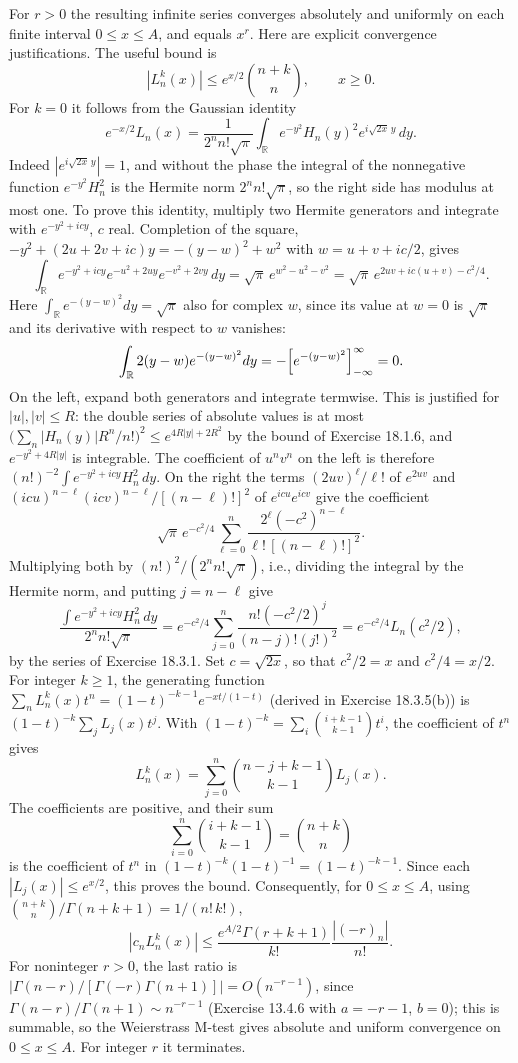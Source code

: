 For $r>0$ the resulting infinite series converges absolutely and
uniformly on each finite interval $0\le x\le A$, and equals $x^r$.
Here are explicit convergence justifications.  The useful bound is
\[
|L_n^k(x)|\le e^{x/2}\binom{n+k}{n},\qquad x\ge0.
\]
For $k=0$ it follows from the Gaussian identity
\[
e^{-x/2}L_n(x)
 =\frac1{2^nn!\sqrt\pi}\int_{\mathbb R}
 e^{-y^2}H_n(y)^2e^{i\sqrt{2x}\,y}\,dy.
\]
Indeed $|e^{i\sqrt{2x}\,y}|=1$, and without the phase the integral of
the nonnegative function $e^{-y^2}H_n^2$ is the Hermite norm
$2^nn!\sqrt\pi$, so the right side has modulus at most one.  To prove
this identity, multiply two Hermite generators and integrate with
$e^{-y^2+icy}$, $c$ real.  Completion of the square,
$-y^2+(2u+2v+ic)y=-(y-w)^2+w^2$ with $w=u+v+ic/2$, gives
\[
\int_{\mathbb R}e^{-y^2+icy}e^{-u^2+2uy}e^{-v^2+2vy}\,dy
 =\sqrt\pi\,e^{w^2-u^2-v^2}
 =\sqrt\pi\,e^{2uv+ic(u+v)-c^2/4}.
\]
Here $\int_{\mathbb R}e^{-(y-w)^2}dy=\sqrt\pi$ also for complex $w$,
since its value at $w=0$ is $\sqrt\pi$ and its derivative with respect
to $w$ vanishes:
\[
\int_{\mathbb R}2(y-w)e^{-(y-w)^2}dy
 =-\Bigl[e^{-(y-w)^2}\Bigr]_{-\infty}^{\infty}=0.
\]
On the left, expand both generators and integrate termwise.  This is
justified for $|u|,|v|\le R$: the double series of absolute values is
at most $\bigl(\sum_n|H_n(y)|R^n/n!\bigr)^2\le e^{4R|y|+2R^2}$ by the
bound of Exercise 18.1.6, and $e^{-y^2+4R|y|}$ is integrable.  The
coefficient of $u^nv^n$ on the left is therefore
$(n!)^{-2}\int e^{-y^2+icy}H_n^2\,dy$.  On the right
the terms $(2uv)^\ell/\ell!$ of $e^{2uv}$ and
$(icu)^{n-\ell}(icv)^{n-\ell}/[(n-\ell)!]^2$ of $e^{icu}e^{icv}$ give
the coefficient
\[
\sqrt\pi\,e^{-c^2/4}\sum_{\ell=0}^n
 \frac{2^\ell(-c^2)^{n-\ell}}{\ell!\,[(n-\ell)!]^2}.
\]
Multiplying both by $(n!)^2/(2^nn!\sqrt\pi)$, i.e., dividing the
integral by the Hermite norm, and putting $j=n-\ell$ give
\[
\frac{\int e^{-y^2+icy}H_n^2\,dy}{2^nn!\sqrt\pi}
 =e^{-c^2/4}\sum_{j=0}^n
 \frac{n!(-c^2/2)^j}{(n-j)!(j!)^2}
 =e^{-c^2/4}L_n(c^2/2),
\]
by the series of Exercise 18.3.1.  Set $c=\sqrt{2x}$, so that
$c^2/2=x$ and $c^2/4=x/2$.  For integer $k\ge1$, the generating
function $\sum_nL_n^k(x)t^n=(1-t)^{-k-1}e^{-xt/(1-t)}$ (derived in
Exercise 18.3.5(b)) is $(1-t)^{-k}\sum_jL_j(x)t^j$.  With
$(1-t)^{-k}=\sum_i\binom{i+k-1}{k-1}t^i$, the coefficient of $t^n$ gives
\[
L_n^k(x)=\sum_{j=0}^n\binom{n-j+k-1}{k-1}L_j(x).
\]
The coefficients are positive, and their sum
\[
\sum_{i=0}^n\binom{i+k-1}{k-1}=\binom{n+k}{n}
\]
is the coefficient of $t^n$ in $(1-t)^{-k}(1-t)^{-1}=(1-t)^{-k-1}$.
Since each $|L_j(x)|\le e^{x/2}$, this proves the bound.  Consequently, for
$0\le x\le A$, using $\binom{n+k}{n}/\Gamma(n+k+1)=1/(n!\,k!)$,
\[
|c_nL_n^k(x)|\le
 \frac{e^{A/2}\Gamma(r+k+1)}{k!}\frac{|(-r)_n|}{n!}.
\]
For noninteger $r>0$, the last ratio is
$|\Gamma(n-r)/[\Gamma(-r)\Gamma(n+1)]|=O(n^{-r-1})$, since
$\Gamma(n-r)/\Gamma(n+1)\sim n^{-r-1}$ (Exercise 13.4.6 with $a=-r-1$,
$b=0$); this is summable, so the Weierstrass M-test gives absolute and
uniform convergence on $0\le x\le A$.  For integer $r$ it terminates.

